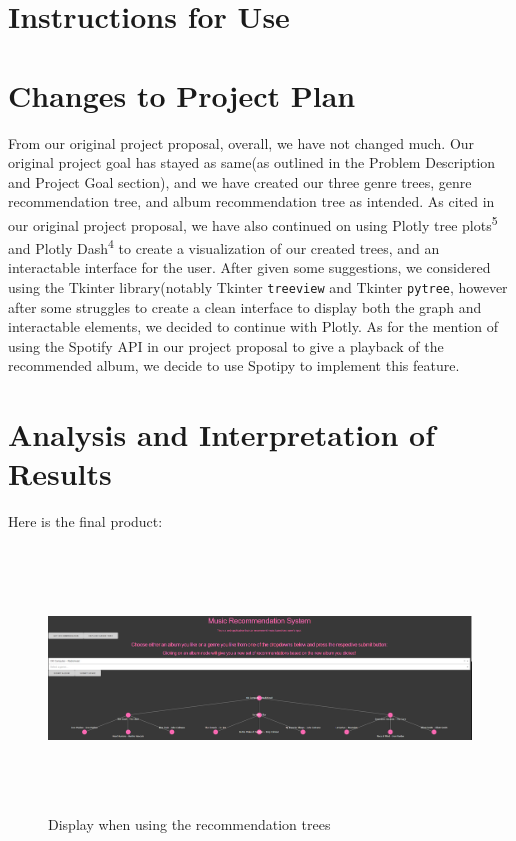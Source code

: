 \documentclass[fontsize=11pt]{article}
\begin{document}
\section*{Instructions for Use}

\section*{Changes to Project Plan}

From our original project proposal, overall, we have not changed much. Our original project goal has stayed as same(as outlined in the Problem Description and Project Goal section), and we have created our three genre trees, genre recommendation tree, and album recommendation tree as intended. As cited in our original project proposal, we have also continued on using Plotly tree plots\textsuperscript{5} and Plotly Dash\textsuperscript{4} to create a visualization of our created trees, and an interactable interface for the user. After given some suggestions, we considered using the Tkinter library(notably Tkinter \texttt{treeview} and Tkinter \texttt{pytree}, however after some struggles to create a clean interface to display both the graph and interactable elements, we decided to continue with Plotly. As for the mention of using the Spotify API in our project proposal to give a playback of the recommended album, we decide to use Spotipy to implement this feature. 

\section*{Analysis and Interpretation of Results}

Here is the final product: \newline

\begin{figure}[h]
    \centering
    \includegraphics[height=7cm, width=18cm]{examplerun.png}
    \caption{Display when using the recommendation trees}
    \label{fig:my_label}
\end{figure}
\end{document}
